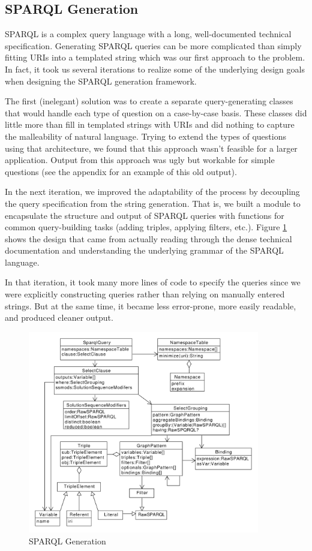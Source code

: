 \documentclass[11pt]{article}
\begin{document}
{\subsection{SPARQL Generation}
\label{section:sparql_gen}
SPARQL is a complex query language with a long, well-documented 
technical specification\cite{sparql, sparql11}. Generating SPARQL queries can be
more complicated than simply fitting URIs into a templated string which was our
first approach to the problem. In fact, it took us several iterations to realize
some of the underlying design goals when designing the SPARQL generation framework.

The first (inelegant) solution was to create a separate query-generating
classes that would handle each type of question on a case-by-case basis.
These classes did little more than fill in templated strings with URIs and did
nothing to capture the malleability of natural language.
Trying to extend the types of questions using that architecture, we found that
this approach wasn't feasible for a larger application.
Output from this approach was ugly but workable for simple questions (see the
appendix for an example of this old output).

In the next iteration, we improved the adaptability of the process by 
decoupling the query specification from the string generation. 
That is, we built a module to encapsulate the structure and output of SPARQL
queries with functions for common query-building tasks (adding triples, 
applying filters, etc.). Figure \ref{fig:sparql_gen} shows the design that came from
actually reading through the dense technical documentation and understanding the
underlying grammar of the SPARQL language.

In that iteration, it took many more lines of code to specify the queries since
we were explicitly constructing queries rather than relying on manually
entered strings. But at the same time, it became less error-prone, more
easily readable, and produced cleaner output.

\begin{figure}[h!]
    \centering
    \includegraphics[width=0.9\textwidth,natwidth=1,natheight=1]{umlet/sparql.pdf}
    \caption{SPARQL Generation \cite{sparql, sparql11}}
    \label{fig:sparql_gen}
\end{figure}

}
\end{document}
